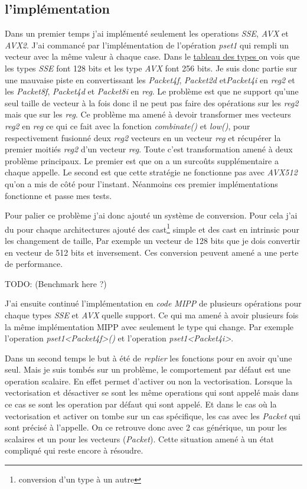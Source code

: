 \subsection{l'implémentation}

Dans un premier temps j'ai implémenté seulement les operations \emph{SSE}, \emph{AVX} et
\emph{AVX2}.
J'ai commancé par l'implémentation de l'opération \emph{pset1} qui rempli un vecteur avec
la même valeur à chaque case. Dans le \hyperref[eigenTypesTable]{tableau des types \Eigen}
on vois que les types \emph{SSE} font 128 bits et les type \emph{AVX} font 256 bits. Je
suis donc partie sur une mauvaise piste en convertissant les \emph{Packet4f},
\emph{Packet2d} et\emph{Packet4i} en \emph{reg2} et les \emph{Packet8f}, \emph{Packet4d}
et \emph{Packet8i} en \emph{reg}. Le problème est que \MIPP ne support qu'une seul taille
de vecteur à la fois donc il ne peut pas faire des opérations sur les \emph{reg2} mais
que sur les \emph{reg}. Ce problème ma amené à devoir transformer mes vecteurs \emph{reg2}
en \emph{reg} ce qui ce fait avec la fonction \emph{combinate()} et \emph{low()}, pour
respectivement fusionné deux \emph{reg2} vecteurs en un vecteur \emph{reg} et récupérer
la premier moitiés \emph{reg2} d'un vecteur \emph{reg}. Toute c'est transformation amené
à deux problème principaux. Le premier est que on a un surcoûts supplémentaire a chaque
appelle. Le second est que cette stratégie ne fonctionne pas avec \emph{AVX512} qu'on a
mis de côté pour l'instant. Néanmoins ces premier implémentations fonctionne et passe
mes tests.

Pour palier ce problème j'ai donc ajouté un système de conversion. Pour cela j'ai du pour
chaque architectures ajouté des cast\footnote{conversion d'un type à un autre} simple et
des cast en intrinsic pour les changement de taille, Par exemple un vecteur de 128 bits
que je dois convertir en vecteur de 512 bits et inversement.
Ces conversion peuvent amené a une perte de performance.

TODO: (Benchmark here ?)

J'ai ensuite continué l'implémentation en \emph{code MIPP} de plusieurs opérations pour
chaque types \emph{SSE} et \emph{AVX} quelle support. Ce qui ma amené à avoir plusieurs
fois la même implémentation MIPP avec seulement le type qui change. Par exemple
l'operation \emph{pset1<Packet4f>()} et l'operation \emph{pset1<Packet4i>}.

Dans un second temps le but à été de \textit{replier} les fonctions pour en avoir qu'une
seul. Mais je suis tombés sur un problème, le comportement par défaut est une operation
scalaire. En effet \Eigen permet d'activer ou non la vectorisation. Lorsque la
vectorisation et désactiver se sont les même operations qui sont appelé mais dans ce cas
se sont les operation par défaut qui sont appelé. Et dans le cas où la vectorisation et
activer on tombe sur un cas spécifique, les cas avec les \emph{Packet} qui sont précisé
à l'appelle. On ce retrouve donc avec 2 cas générique, un pour les scalaires
et un pour les vecteurs (\emph{Packet}). Cette situation amené à un état compliqué qui
reste encore à résoudre.

